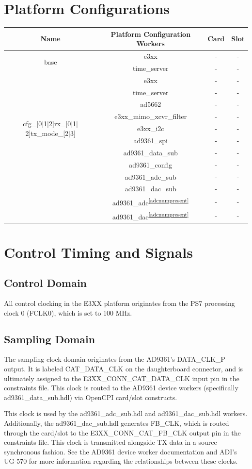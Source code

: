 \documentclass{article}
\def\comp{e3xx}
\begin{document}
\section*{Platform Configurations}
	\begin{tabular}{|c|c|c|c|}
		\hline
		\rowcolor{blue}
		Name & Platform Configuration Workers & Card & Slot \\
		\hline
		\multirow{2}{*}{base} &\comp & - & - \\ &time\_server & - & - \\
		\hline
		\multirow{9}{*}{cfg\_[0$|$1$|$2]rx\_[0$|$1$|$2]tx\_mode\_[2$|$3]} &\comp & - & - \\ &time\_server & - & - \\ &ad5662& - & - \\ &e3xx\_mimo\_xcvr\_filter & - & - \\ &e3xx\_i2c & - & - \\ &ad9361\_spi & - & - \\ &ad9361\_data\_sub & - & - \\ &ad9361\_config & - & - \\ &ad9361\_adc\_sub & - & - \\ &ad9361\_dac\_sub & - & - \\ &ad9361\_adc\textsuperscript{\ref{adcnumpresent}} & - & - \\ &ad9361\_dac\textsuperscript{\ref{adcnumpresent}} & - & - \\
		\hline
	\end{tabular}
\section*{Control Timing and Signals}
\subsection*{Control Domain}
All control clocking in the E3XX platform originates from the PS7 processing clock 0 (FCLK0), which is set to 100 MHz.

\subsection*{Sampling Domain}
The sampling clock domain originates from the AD9361's DATA\_CLK\_P output. It is labeled CAT\_DATA\_CLK on the daughterboard connector, and is ultimately assigned to the E3XX\_CONN\_CAT\_DATA\_CLK input pin in the constraints file. This clock is routed to the AD9361 device workers (specifically ad9361\_data\_sub.hdl) via OpenCPI card/slot constructs.\par\medskip
\noindent This clock is used by the ad9361\_adc\_sub.hdl and ad9361\_dac\_sub.hdl workers. Additionally, the ad9361\_dac\_sub.hdl generates FB\_CLK, which is routed through the card/slot to the E3XX\_CONN\_CAT\_FB\_CLK output pin in the constraints file. This clock is transmitted alongside TX data in a source synchronous fashion. See the AD9361 device worker documentation and ADI's UG-570 for more information regarding the relationships between these clocks.
\end{document}
